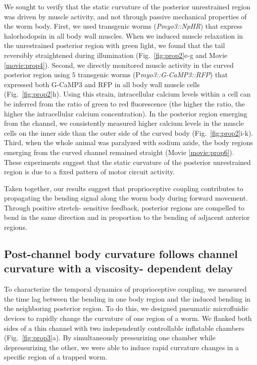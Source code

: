 We sought to verify that the static curvature of the posterior unrestrained region was driven by 
muscle activity, and not through passive mechanical properties of the worm body. First, we used 
transgenic worms (\textit{Pmyo3::NpHR}) that express halorhodopsin \citep{han_multiple-color_2007} in all body wall muscles. 
When we induced muscle relaxation in the unrestrained posterior region with green light, we 
found that the tail reversibly straightened during illumination (Fig.~\ref{fig:prop2}e-g and 
Movie \ref{movie:prop4}). Second, we directly monitored muscle activity in the curved posterior region using 
 $5$
transgenic worms (P\textit{myo3::G-CaMP3::RFP}) that expressed both G-CaMP3 and RFP in all body 
wall muscle cells (Fig.~\ref{fig:prop2}h). Using this strain, intracellular calcium levels within a cell can be 
inferred from the ratio of green to red fluorescence (the higher the ratio, the higher the 
intracellular calcium concentration). In the posterior region emerging from the channel, we 
consistently measured higher calcium levels in the muscle cells on the inner side than the outer 
side of the curved body (Fig.~\ref{fig:prop2}i-k). Third, when the whole animal was paralyzed with sodium 
azide, the body regions emerging from the curved channel remained straight (Movie \ref{movie:prop6}). These experiments suggest that the static curvature of the posterior unrestrained region 
is due to a fixed pattern of motor circuit activity. 


Taken together, our results suggest that proprioceptive coupling contributes to propagating the 
bending signal along the worm body during forward movement. Through positive stretch- 
sensitive feedback, posterior regions are compelled to bend in the same direction and in 
proportion to the bending of adjacent anterior regions. 
 
\subsection{Post-channel body curvature follows channel curvature with a viscosity- 
dependent delay}
 
To characterize the temporal dynamics of proprioceptive coupling, we measured the time lag 
between the bending in one body region and the induced bending in the neighboring posterior 
region. To do this, we designed pneumatic microfluidic devices to rapidly change the curvature 
of one region of a worm. We flanked both sides of a thin channel with two independently 
controllable inflatable chambers (Fig.~\ref{fig:prop3}a). By simultaneously pressurizing one chamber while 
depressurizing the other, we were able to induce rapid curvature changes in a specific region of a 
trapped worm. 

